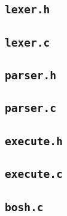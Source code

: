 \subsection{\texttt{lexer.h}}


\subsection{\texttt{lexer.c}}


\subsection{\texttt{parser.h}}


\subsection{\texttt{parser.c}}


\subsection{\texttt{execute.h}}


\subsection{\texttt{execute.c}}


\subsection{\texttt{bosh.c}}

